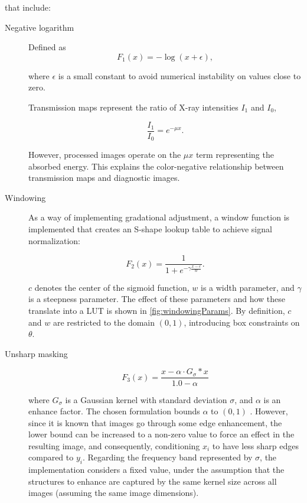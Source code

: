 \documentclass[nomenclature, english, bibtex]{kththesis}
\numberwithin{listing}{chapter}
\begin{document}
that include:
\begin{description}

\item[Negative logarithm] Defined as
\begin{equation}
    F_{1}(x) = -\log(x + \epsilon),
\end{equation}

where $\epsilon$ is a small constant to avoid numerical instability on values close to zero.

    Transmission maps represent the ratio of X-ray intensities $I_1$ and $I_0$,

    \begin{equation}
        \frac{I_1}{I_0} = e^{-\mu x}.
    \end{equation}

    However, processed images operate on the $\mu x$ term representing the absorbed energy. This explains the color-negative
    relationship between transmission maps and diagnostic images.

\item[Windowing] As a way of implementing gradational adjustment, a window function is implemented that creates
an S-shape lookup table to achieve signal normalization:

\begin{equation}
    F_2(x) = \frac{1}{1+e^{-\gamma \frac{x - c}{w}}}.
\end{equation}

$c$ denotes the center of the sigmoid function, $w$ is a width parameter, and $\gamma$ is a steepness parameter.
The effect of these parameters and how these translate into a LUT is shown in \autoref{fig:windowingParams}.
By definition, $c$ and $w$ are restricted to the domain $(0, 1)$, introducing box constraints on
$\theta$.

\item[Unsharp masking]
\begin{equation}
    F_3(x) = \frac{x - \alpha \cdot G_\sigma * x}{1.0 - \alpha}
\end{equation}

where $G_\sigma$ is a Gaussian kernel with standard deviation $\sigma$, and $\alpha$ is an enhance factor.
The chosen formulation bounds $\alpha$ to $(0, 1)$ . However, since it is known that images go through
some edge enhancement, the lower bound can be increased to a non-zero value to force an effect
in the resulting image, and consequently, conditioning $x_i$ to have less sharp edges compared to $y_i$.
Regarding the frequency band represented by $\sigma$, the implementation considers a fixed value,
under the assumption that the structures to enhance are captured by the same kernel size across all images
(assuming the same image dimensions).

\end{description}
\end{document}

